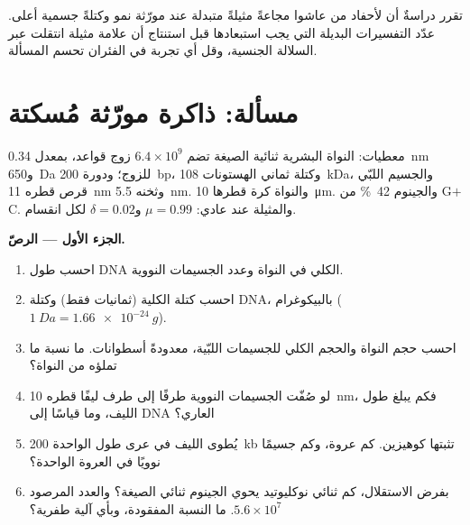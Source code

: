 \begin{exercise}[$\star\star\star$]\label{exo:b3:chromatin-epigenetics:12}
تقرر دراسةٌ أن لأحفاد من عاشوا مجاعةً مثيلةً متبدلة عند مورّثة نمو
وكتلةً جسمية أعلى. عدّد التفسيرات البديلة التي يجب استبعادها قبل
استنتاج أن علامة مثيلة انتقلت عبر السلالة الجنسية، وقل أي تجربة في
الفئران تحسم المسألة.
\end{exercise}

\section{مسألة: ذاكرة مورّثة مُسكتة}

\begin{problem}
\label{pb:b3:chromatin-epigenetics:1}
معطيات: النواة البشرية ثنائية الصيغة تضم $6.4\times 10^{9}$ زوج
قواعد، بمعدل \qty{0.34}{nm} و\qty{650}{Da} للزوج؛ ودورة 
\qty{200}{bp}، وكتلة ثماني الهستونات \qty{108}{kDa}، والجسيم اللبّي
قرص قطره \qty{11}{nm} وثخنه \qty{5.5}{nm}. والنواة كرة قطرها
\qty{10}{\micro m}. والجينوم \qty{42}{\%} من G$+$C. والمثيلة عند
 عادي: $\mu = 0.99$ و$\delta = 0.02$ لكل انقسام.

\medskip
\noindent\textbf{الجزء الأول --- الرصّ.}
\begin{enumerate}
  \item احسب طول DNA الكلي في النواة وعدد الجسيمات النووية.
  \item احسب كتلة  الكلية (ثمانيات فقط) وكتلة DNA،
        بالبيكوغرام ($\qty{1}{Da} = \qty{1.66e-24}{g}$).
  \item احسب حجم النواة والحجم الكلي للجسيمات اللبّية، معدودةً
        أسطوانات. ما نسبة ما تملؤه من النواة؟
  \item لو صُفّت الجسيمات النووية طرفًا إلى طرف ليفًا قطره
        \qty{10}{nm}، فكم يبلغ طول الليف، وما  قياسًا إلى
        DNA العاري؟
  \item يُطوى الليف في عرى طول الواحدة \qty{200}{kb} تثبتها كوهيزين.
        كم عروة، وكم جسيمًا نوويًا في العروة الواحدة؟
  \item بفرض الاستقلال، كم ثنائي نوكليوتيد  يحوي الجينوم ثنائي
        الصيغة؟ والعدد المرصود $5.6\times 10^{7}$. ما النسبة
        المفقودة، وبأي آلية طفرية؟
\end{enumerate}


\end{problem}
